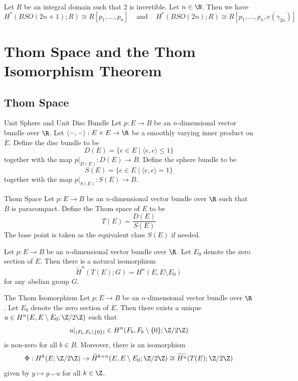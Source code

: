 \documentclass[a4paper]{article}
\begin{document}
\begin{prp}{}{}\\
Let $R$ be an integral domain such that $2$ is invertible. Let $n\in\N$. Then we have $$H^\ast(BSO(2n+1);R)\cong R[p_1,\dots,p_n]\;\;\;\text{ and }\;\;\;H^\ast(BSO(2n);R)\cong R[p_1,\dots,p_n,e(\gamma_{2n})]$$
\end{prp}

\pagebreak
\section{Thom Space and the Thom Isomorphism Theorem}
\subsection{Thom Space}
\begin{defn}{Unit Sphere and Unit Disc Bundle}{} Let $p:E\to B$ be an $n$-dimensional vector bundle over $\R$. Let $\langle-,-\rangle:E\times E\to\R$ be a smoothly varying inner product on $E$. Define the disc bundle to be $$D(E)=\{e\in E\;|\;\langle e,e\rangle\leq 1\}$$ together with the map $p|_{D(E)}:D(E)\to B$. Define the sphere bundle to be $$S(E)=\{e\in E\;|\;\langle e,e\rangle=1\}$$ together with the map $p|_{S(E)}:S(E)\to B$. 
\end{defn}

\begin{defn}{Thom Space}{} Let $p:E\to B$ be an $n$-dimensional vector bundle over $\R$ such that $B$ is paracompact. Define the Thom space of $E$ to be $$T(E)=\frac{D(E)}{S(E)}$$ The base point is taken as the equivalent class $S(E)$ if needed. 
\end{defn}

\begin{lmm}{}{} Let $p:E\to B$ be an $n$-dimensional vector bundle over $\R$. Let $E_0$ denote the zero section of $E$. Then there is a natural isomorphism $$\widetilde{H}^n(T(E);G)=H^n(E,E\setminus E_0)$$ for any abelian group $G$. 
\end{lmm}

\begin{thm}{The Thom Isomorphism}{} Let $p:E\to B$ be an $n$-dimensional vector bundle over $\R$. Let $E_0$ denote the zero section of $E$. Then there exists a unique $u\in H^n(E,E\setminus E_0;\Z/2\Z)$ such that $$u|_{(F_b,F_b\setminus\{0\})}\in H^n(F_b,F_b\setminus\{0\};\Z/2\Z)$$ is non-zero for all $b\in B$. Moreover, there is an isomorphism $$\Phi:H^k(E;\Z/2\Z)\to\widetilde{H}^{k+n}(E,E\setminus E_0;\Z/2\Z)\cong\widetilde{H^n}(T(E);\Z/2\Z)$$ given by $y\mapsto y\smile u$ for all $k\in\Z$. 
\end{thm}
\end{document}
